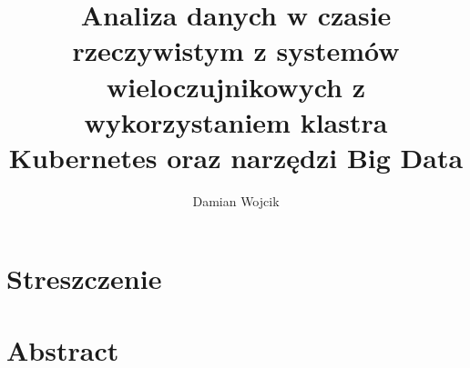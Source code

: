 \documentclass[12pt]{przejsciowka}
\title{Analiza danych w czasie rzeczywistym z systemów wieloczujnikowych z wykorzystaniem klastra Kubernetes oraz narzędzi Big Data}
\author{Damian Wojcik}
\newcommand{\inputcleanchapter}[1]{%
    \begingroup
    
    \endgroup
}
\begin{document}
    \maketitle
    \tableofcontents
    \clearpage

    \section*{Streszczenie}
    \inputcleanchapter{abstract_pl}
    \clearpage

    \section*{Abstract}
    \inputcleanchapter{abstract_en}
    \clearpage


    \inputcleanchapter{rozdzial1_wprowadzenie}
    \clearpage


    \inputcleanchapter{rozdzial2_przeglad_literatury}
    \clearpage


    \inputcleanchapter{rozdzial3_projekt_systemu}
    \clearpage


    \inputcleanchapter{rozdzial4_implementacja_systemu}
    \clearpage
    
    
    
    
    
    
    \inputcleanchapter{rozdzial7_zastosowania}
    \clearpage
    
    
    \inputcleanchapter{rozdzial8_podsumowanie}
    \clearpage

    \listoffigures
    \clearpage

    \listoftables
    \clearpage

    
    \clearpage
\end{document}
